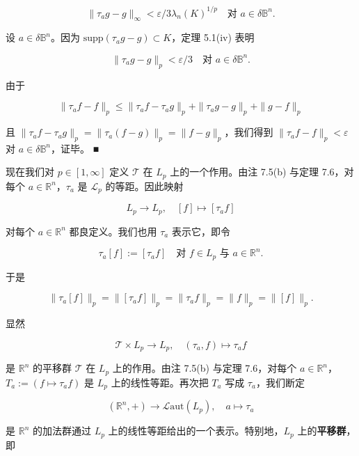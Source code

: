 \begin{theorem}
\begin{subitems}
\[
\|\tau_{a}g - g\|_{\infty} < \varepsilon/3\lambda_{n}(K)^{1/p} \quad \text{对 } a \in \delta\mathbb{B}^{n} .
\]

设 $ a \in \delta\mathbb{B}^{n} $。因为 $ \mathrm{supp}(\tau_{a}g - g) \subset K $，定理 5.1(iv) 表明

\[
\|\tau_{a}g - g\|_{p} < \varepsilon/3 \quad \text{对 } a \in \delta\mathbb{B}^{n} .
\]

由于

\[
\|\tau_{a}f - f\|_{p} \le \|\tau_{a}f - \tau_{a}g\|_{p} + \|\tau_{a}g - g\|_{p} + \|g - f\|_{p}
\]

且 $ \|\tau_{a}f - \tau_{a}g\|_{p} = \|\tau_{a}(f-g)\|_{p} = \|f-g\|_{p} $，我们得到 $ \|\tau_{a}f - f\|_{p} < \varepsilon $ 对 $ a \in \delta\mathbb{B}^{n} $，证毕。 \nobreak\hspace{0.35em}■

\end{subitems}

\end{theorem}

现在我们对 $ p \in [1,\infty] $ 定义 $ \mathcal{T} $ 在 $ L_{p} $ 上的一个作用。由注 7.5(b) 与定理 7.6，对每个 $ a \in \mathbb{R}^{n} $，$ \tau_{a} $ 是 $ \mathcal{L}_{p} $ 的等距。因此映射

\[
L_{p} \to L_{p} , \quad [f] \mapsto [\tau_{a}f]
\]

对每个 $ a \in \mathbb{R}^{n} $ 都良定义。我们也用 $ \tau_{a} $ 表示它，即令

\[
\tau_{a}[f] := [\tau_{a}f] \quad \text{对 } f \in L_{p} \text{ 与 } a \in \mathbb{R}^{n} .
\]

于是

\begin{equation}
\|\tau_{a}[f]\|_{p} = \|[\tau_{a}f]\|_{p} = \|\tau_{a}f\|_{p} = \|f\|_{p} = \|[f]\|_{p} .\tag{7.6}
\end{equation}

显然

\[
\mathcal{T} \times L_{p} \to L_{p} , \quad (\tau_{a},f) \mapsto \tau_{a}f
\]

是 $ \mathbb{R}^{n} $ 的平移群 $ \mathcal{T} $ 在 $ L_{p} $ 上的作用。由注 7.5(b) 与定理 7.6，对每个 $ a \in \mathbb{R}^{n} $，$ T_{a} := (f \mapsto \tau_{a}f) $ 是 $ L_{p} $ 上的线性等距。再次把 $ T_{a} $ 写成 $ \tau_{a} $，我们断定

\[
(\mathbb{R}^{n},+) \to \mathcal{L}\mathrm{aut}(L_{p}) , \quad a \mapsto \tau_{a}
\]

是 $ \mathbb{R}^{n} $ 的加法群通过 $ L_{p} $ 上的线性等距给出的一个表示。特别地，$ L_{p} $ 上的\textbf{平移群}，即

